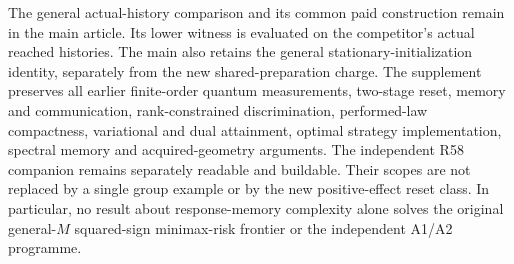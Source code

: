 The general actual-history comparison and its common paid construction
remain in the main article.  Its lower witness is evaluated on the
competitor's actual reached histories.  The main also retains the
general stationary-initialization identity, separately from the new
shared-preparation charge.  The supplement preserves all earlier
finite-order quantum measurements, two-stage reset, memory and
communication, rank-constrained discrimination, performed-law
compactness, variational and dual attainment, optimal strategy
implementation, spectral memory and acquired-geometry arguments.
The independent R58 companion remains separately readable and buildable.
Their scopes are not replaced by a single group example or by the
new positive-effect reset class.  In particular, no result about
response-memory complexity alone solves the original general-$M$
squared-sign minimax-risk frontier or the independent A1/A2 programme.
